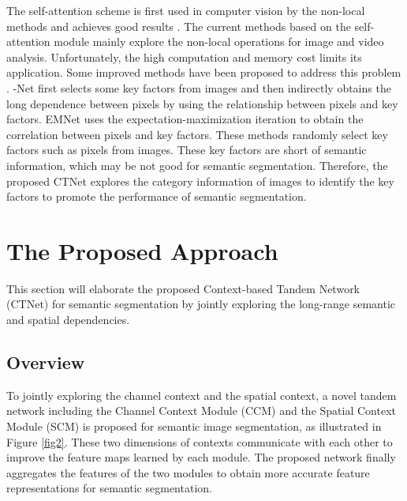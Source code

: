 \documentclass[10pt,journal,cspaper,compsoc]{IEEEtran}
\begin{document}
The self-attention scheme is first used in computer vision by the non-local methods and achieves good results \cite{wang2018non}. The current methods \cite{wang2018non, fu2019dual} based on the self-attention module mainly explore the non-local operations for image and video analysis. Unfortunately, the high computation and memory cost limits its application. Some improved methods have been proposed to address this problem \cite{huang2019ccnet, li2019expectation, chen20182, zhu2019asymmetric, yin2020disentangled}. -Net \cite{chen20182} first selects some key factors from images and then indirectly obtains the long dependence between pixels by using the relationship between pixels and key factors. EMNet \cite{li2019expectation} uses the expectation-maximization iteration to obtain the correlation between pixels and key factors. These methods randomly select key factors such as pixels from images. These key factors are short of semantic information, which may be not good for semantic segmentation. Therefore, the proposed CTNet explores the category information of images to identify the key factors to promote the performance of semantic segmentation.
	
\section{The Proposed Approach}
This section will elaborate the proposed Context-based Tandem Network (CTNet) for semantic segmentation by jointly exploring the long-range semantic and spatial dependencies.


\subsection{Overview}
To jointly exploring the channel context and the spatial context, a novel tandem network including the Channel Context Module (CCM) and the Spatial Context Module (SCM) is proposed for semantic image segmentation, as illustrated in Figure \ref{fig2}. These two dimensions of contexts communicate with each other to improve the feature maps learned by each module. The proposed network finally aggregates the features of the two modules to obtain more accurate feature representations for semantic segmentation.
	
\end{document}
